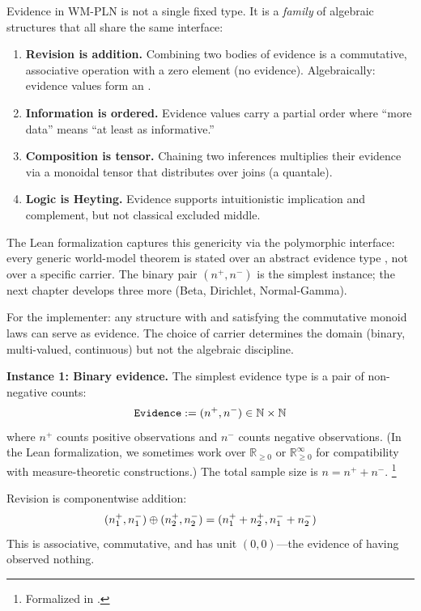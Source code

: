 \documentclass[11pt,openany]{report}
\begin{document}
Evidence in WM-PLN is not a single fixed type.  It is a \emph{family}
of algebraic structures that all share the same interface:

\begin{enumerate}
\item \textbf{Revision is addition.}  Combining two bodies of evidence
  is a commutative, associative operation with a zero element (no evidence).
  Algebraically: evidence values form an .

\item \textbf{Information is ordered.}  Evidence values carry a partial
  order where ``more data'' means ``at least as informative.''

\item \textbf{Composition is tensor.}  Chaining two inferences multiplies
  their evidence via a monoidal tensor that distributes over joins (a
  quantale).

\item \textbf{Logic is Heyting.}  Evidence supports intuitionistic
  implication and complement, but not classical excluded middle.
\end{enumerate}

\noindent
The Lean formalization captures this genericity via the polymorphic
 interface: every generic world-model theorem
is stated over an abstract evidence type , not over a specific
carrier.  The binary pair $(n^+, n^-)$ is the simplest instance; the
next chapter develops three more (Beta, Dirichlet, Normal-Gamma).

For the implementer: any structure with \code{+} and  satisfying
the commutative monoid laws can serve as evidence.  The choice of carrier
determines the domain (binary, multi-valued, continuous) but not the
algebraic discipline.

\medskip
\noindent
\textbf{Instance 1: Binary evidence.}
The simplest evidence type is a pair of non-negative counts:
\[
  \mathtt{Evidence} := (n^+, n^-) \in \mathbb{N} \times \mathbb{N}
\]
where $n^+$ counts positive observations and $n^-$ counts negative
observations.  (In the Lean formalization, we sometimes work over
$\mathbb{R}_{\ge 0}$ or $\mathbb{R}_{\ge 0}^\infty$ for compatibility
with measure-theoretic constructions.)  The total sample size is
$n = n^+ + n^-$.%
\footnote{Formalized in .}

Revision is componentwise addition:
\[
  (n_1^+, n_1^-) \oplus (n_2^+, n_2^-) = (n_1^+ + n_2^+, n_1^- + n_2^-)
\]
This is associative, commutative, and has unit $(0, 0)$---the evidence
of having observed nothing.
\end{document}
